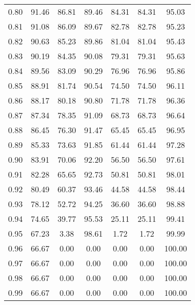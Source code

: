 \begin{tabular}{|c|c|c|c|c|c|c|}
      0.80 &     91.46 &     86.81 &      89.46 &   84.31 &      84.31 &         95.03 \\
      0.81 &     91.08 &     86.09 &      89.67 &   82.78 &      82.78 &         95.23 \\
      0.82 &     90.63 &     85.23 &      89.86 &   81.04 &      81.04 &         95.43 \\
      0.83 &     90.19 &     84.35 &      90.08 &   79.31 &      79.31 &         95.63 \\
      0.84 &     89.56 &     83.09 &      90.29 &   76.96 &      76.96 &         95.86 \\
      0.85 &     88.91 &     81.74 &      90.54 &   74.50 &      74.50 &         96.11 \\
      0.86 &     88.17 &     80.18 &      90.80 &   71.78 &      71.78 &         96.36 \\
      0.87 &     87.34 &     78.35 &      91.09 &   68.73 &      68.73 &         96.64 \\
      0.88 &     86.45 &     76.30 &      91.47 &   65.45 &      65.45 &         96.95 \\
      0.89 &     85.33 &     73.63 &      91.85 &   61.44 &      61.44 &         97.28 \\
      0.90 &     83.91 &     70.06 &      92.20 &   56.50 &      56.50 &         97.61 \\
      0.91 &     82.28 &     65.65 &      92.73 &   50.81 &      50.81 &         98.01 \\
      0.92 &     80.49 &     60.37 &      93.46 &   44.58 &      44.58 &         98.44 \\
      0.93 &     78.12 &     52.72 &      94.25 &   36.60 &      36.60 &         98.88 \\
      0.94 &     74.65 &     39.77 &      95.53 &   25.11 &      25.11 &         99.41 \\
      0.95 &     67.23 &      3.38 &      98.61 &    1.72 &       1.72 &         99.99 \\
      0.96 &     66.67 &      0.00 &       0.00 &    0.00 &       0.00 &        100.00 \\
      0.97 &     66.67 &      0.00 &       0.00 &    0.00 &       0.00 &        100.00 \\
      0.98 &     66.67 &      0.00 &       0.00 &    0.00 &       0.00 &        100.00 \\
      0.99 &     66.67 &      0.00 &       0.00 &    0.00 &       0.00 &        100.00 \\
\bottomrule
\end{tabular}
